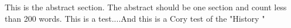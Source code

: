 This is the abstract section. The abstract should be one section and count less than 200 words. This is a test....And this is a Cory test of the "History "